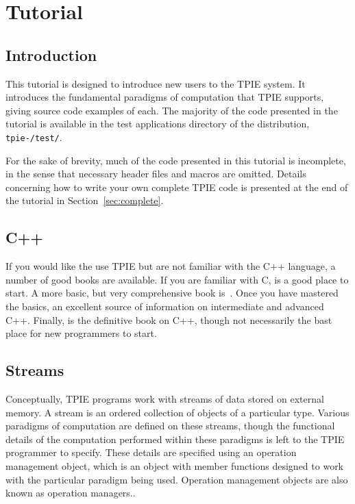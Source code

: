 \chapter{Tutorial}
\label{ch:tutorial}

\section{Introduction}

This tutorial is designed to introduce new users to the TPIE system.
It introduces the fundamental paradigms of computation that TPIE
supports, giving source code examples of each.  The majority of the
code presented in the tutorial is available in the test
applications directory of the distribution, 
{\tt tpie-\version/test/}.

For the sake of brevity, much of the code presented in this tutorial
is incomplete, in the sense that necessary header files 
 and macros are omitted.  Details 
concerning how to write your own complete TPIE code is presented at
the end of the tutorial in Section~\ref{sec:complete}.

\section{C++}

If you would like the use TPIE but are not familiar with the
C++ language, a number of good books are available.  If you
are familiar with C, \cite{pohl:c++} is a good place to
start.  A more basic, but very comprehensive book
is~\cite{deitel:c++}.  Once you have mastered the basics,
\cite{meyers:effective} an excellent source of information on
intermediate and advanced C++.  Finally, \cite{ellis:arm} is the
definitive book on C++, though not necessarily the bast place for new
programmers to start.


\section{Streams}

Conceptually, TPIE programs work with streams of data stored on
external memory.  A stream is an ordered collection of objects of a
particular type.  Various paradigms of computation are defined on
these streams, though the functional details of the computation
performed within these paradigms is left to the TPIE programmer to
specify.  These details are specified using an operation management
object, which is an object with
member functions designed to work with the particular paradigm being
used.  Operation management objects are also known as operation
managers..


